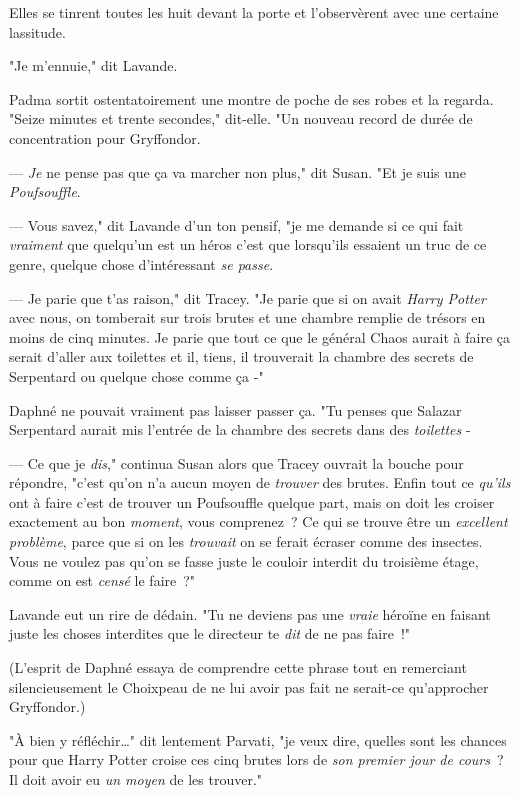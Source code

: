 Elles se tinrent toutes les huit devant la porte et l'observèrent avec une certaine lassitude.

"Je m'ennuie," dit Lavande.

Padma sortit ostentatoirement une montre de poche de ses robes et la regarda. "Seize minutes et trente secondes," dit-elle. "Un nouveau record de durée de concentration pour Gryffondor.

--- \emph{Je} ne pense pas que ça va marcher non plus," dit Susan. "Et je suis une \emph{Poufsouffle}.

--- Vous savez," dit Lavande d'un ton pensif, "je me demande si ce qui fait \emph{vraiment} que quelqu'un est un héros c'est que lorsqu'ils essaient un truc de ce genre, quelque chose d'intéressant \emph{se passe}.

--- Je parie que t'as raison," dit Tracey. "Je parie que si on avait \emph{Harry Potter} avec nous, on tomberait sur trois brutes et une chambre remplie de trésors en moins de cinq minutes. Je parie que tout ce que le général Chaos aurait à faire ça serait d'aller aux toilettes et il, tiens, il trouverait la chambre des secrets de Serpentard ou quelque chose comme ça -"

Daphné ne pouvait vraiment pas laisser passer ça. "Tu penses que Salazar Serpentard aurait mis l'entrée de la chambre des secrets dans des \emph{toilettes} -

--- Ce que je \emph{dis}," continua Susan alors que Tracey ouvrait la bouche pour répondre, "c'est qu'on n'a aucun moyen de \emph{trouver} des brutes. Enfin tout ce \emph{qu'ils} ont à faire c'est de trouver un Poufsouffle quelque part, mais on doit les croiser exactement au bon \emph{moment}, vous comprenez~? Ce qui se trouve être un \emph{excellent problème}, parce que si on les \emph{trouvait} on se ferait écraser comme des insectes. Vous ne voulez pas qu'on se fasse juste le couloir interdit du troisième étage, comme on est \emph{censé} le faire~?"

Lavande eut un rire de dédain. "Tu ne deviens pas une \emph{vraie} héroïne en faisant juste les choses interdites que le directeur te \emph{dit} de ne pas faire~!"

(L'esprit de Daphné essaya de comprendre cette phrase tout en remerciant silencieusement le Choixpeau de ne lui avoir pas fait ne serait-ce qu'approcher Gryffondor.)

"À bien y réfléchir…" dit lentement Parvati, "je veux dire, quelles sont les chances pour que Harry Potter croise ces cinq brutes lors de \emph{son premier jour de cours}~? Il doit avoir eu \emph{un moyen} de les trouver."

